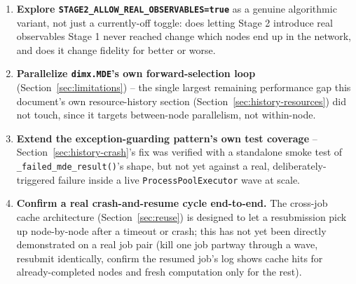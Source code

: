 \documentclass[11pt]{article}
\begin{document}
\begin{enumerate}[leftmargin=1.4em]
  \item \textbf{Explore \texttt{STAGE2\_ALLOW\_REAL\_OBSERVABLES=true}} as a genuine algorithmic variant, not just a currently-off toggle: does letting Stage 2 introduce real observables Stage 1 never reached change which nodes end up in the network, and does it change fidelity for better or worse.
  \item \textbf{Parallelize \texttt{dimx.MDE}'s own forward-selection loop} (Section~\ref{sec:limitations}) -- the single largest remaining performance gap this document's own resource-history section (Section~\ref{sec:history-resources}) did not touch, since it targets between-node parallelism, not within-node.
  \item \textbf{Extend the exception-guarding pattern's own test coverage} -- Section~\ref{sec:history-crash}'s fix was verified with a standalone smoke test of \texttt{\_failed\_mde\_result()}'s shape, but not yet against a real, deliberately-triggered failure inside a live \texttt{ProcessPoolExecutor} wave at scale.
  \item \textbf{Confirm a real crash-and-resume cycle end-to-end.} The cross-job cache architecture (Section~\ref{sec:reuse}) is designed to let a resubmission pick up node-by-node after a timeout or crash; this has not yet been directly demonstrated on a real job pair (kill one job partway through a wave, resubmit identically, confirm the resumed job's log shows cache hits for already-completed nodes and fresh computation only for the rest).
\end{enumerate}

\newpage
\end{document}
